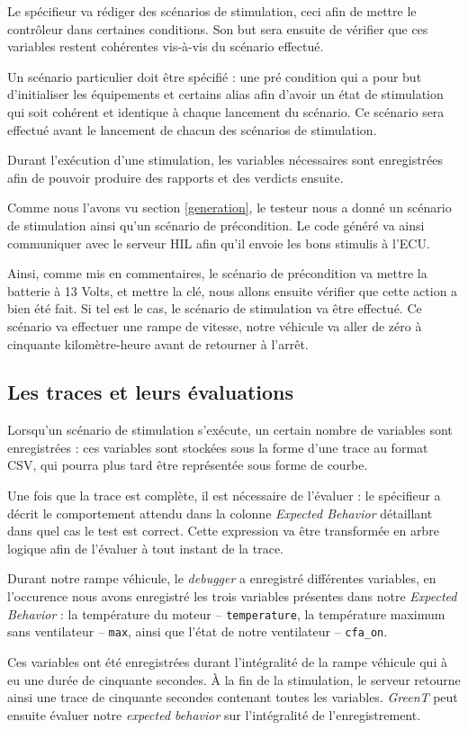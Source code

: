 Le spécifieur va rédiger des scénarios de stimulation, ceci afin de mettre le contrôleur dans certaines conditions. Son but sera ensuite de vérifier que ces variables restent cohérentes vis-à-vis du scénario effectué. 

Un scénario particulier doit être spécifié : une pré condition qui a pour but d'initialiser les équipements et certains alias afin d'avoir un état de stimulation qui soit cohérent et identique à chaque lancement du scénario. Ce scénario sera effectué avant le lancement de chacun des scénarios de stimulation.

Durant l'exécution d'une stimulation, les variables nécessaires sont enregistrées afin de pouvoir produire des rapports et des
verdicts ensuite.
\begin{exemple}
	Comme nous l'avons vu section \ref{generation}, le testeur nous a donné un scénario de stimulation ainsi qu'un scénario de précondition. Le code généré va ainsi communiquer avec le serveur HIL afin qu'il envoie les bons stimulis à l'ECU.

	Ainsi, comme mis en commentaires, le scénario de précondition va mettre la batterie à 13 Volts, et mettre la clé, nous allons ensuite vérifier que cette action a bien été fait. Si tel est le cas, le scénario de stimulation va être effectué. Ce scénario va effectuer une rampe de vitesse, notre véhicule va aller de zéro à cinquante kilomètre-heure avant de retourner à l'arrêt.	
\end{exemple}

\subsection{Les traces et leurs évaluations}\label{expectedBehavior}
Lorsqu'un scénario de stimulation s'exécute, un certain nombre de variables sont enregistrées : ces variables sont stockées sous la forme d'une trace au format CSV, qui pourra plus tard être représentée sous forme de courbe. 

Une fois que la trace est complète, il est nécessaire de l'évaluer : le spécifieur a décrit le comportement attendu dans la colonne \textit{Expected Behavior} détaillant dans quel cas le test est correct. Cette expression va être transformée en arbre logique afin de l'évaluer à tout instant de la trace. 

\begin{exemple}
	Durant notre rampe véhicule, le \textit{debugger} a enregistré différentes variables, en l'occurence nous avons enregistré les trois variables présentes dans notre \textit{Expected Behavior} : la température	du moteur -- \texttt{temperature}, la température maximum sans ventilateur -- \texttt{max}, ainsi que l'état de notre ventilateur -- \texttt{cfa\_on}.
	
	Ces variables ont été enregistrées durant l'intégralité de la rampe véhicule qui à eu une durée de cinquante secondes. À la fin de la stimulation, le serveur retourne ainsi une trace de cinquante secondes contenant toutes les variables. \textit{GreenT} peut ensuite évaluer notre \textit{expected behavior} sur l'intégralité de l'enregistrement.
\end{exemple}
